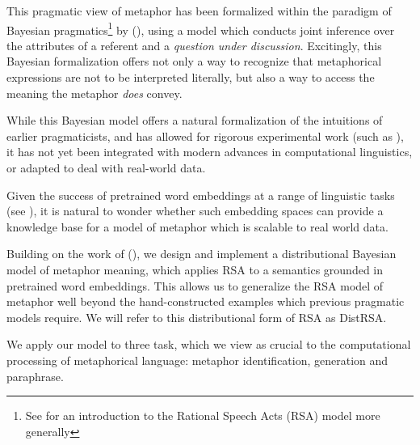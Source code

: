 \documentclass[10pt,letterpaper,twocolumn]{article}
\begin{document}




This pragmatic view of metaphor has been formalized within the paradigm of Bayesian pragmatics\footnote{See \cite{frank2012predicting} for an introduction to the Rational Speech Acts (RSA) model more generally} by (\cite{kao}), using a model which conducts joint inference over the attributes of a referent and a \emph{question under discussion}. Excitingly, this Bayesian formalization offers not only a way to recognize that metaphorical expressions are not to be interpreted literally, but also a way to access the meaning the metaphor \emph{does} convey.

While this Bayesian model offers a natural formalization of the intuitions of earlier pragmaticists, and has allowed for rigorous experimental work (such as \cite{frank2012predicting}), it has not yet been integrated with modern advances in computational linguistics, or adapted to deal with real-world data.

Given the success of pretrained word embeddings at a range of linguistic tasks (see \cite{turney2010frequency}), it is natural to wonder whether such embedding spaces can provide a knowledge base for a model of metaphor which is scalable to real world data.

Building on the work of (\cite{kao}), we design and implement a distributional Bayesian model of metaphor meaning, which applies RSA to a semantics grounded in pretrained word embeddings. This allows us to generalize the RSA model of metaphor well beyond the hand-constructed examples which previous pragmatic models require. We will refer to this distributional form of RSA as DistRSA.

We apply our model to three task, which we view as crucial to the computational processing of metaphorical language: metaphor identification, generation and paraphrase.


\end{document}
